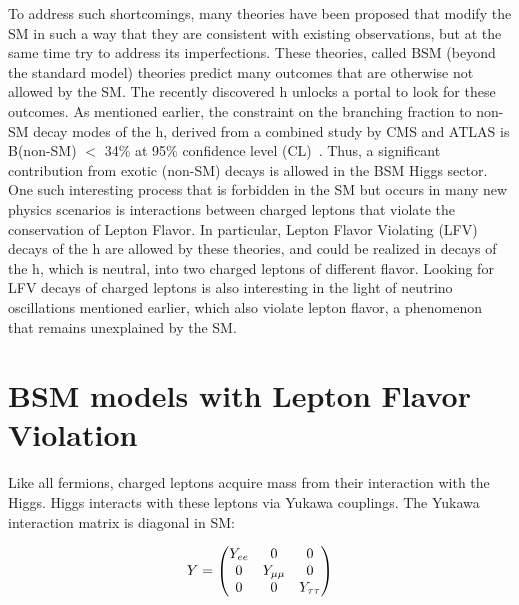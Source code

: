 To address such shortcomings, many theories have been proposed that modify the SM in such a way that they are consistent with existing observations, but at the same time try to address its imperfections. These theories, called BSM (beyond the standard model) theories predict many outcomes that are otherwise not allowed by the SM. The recently discovered h unlocks a portal to look for these outcomes. As mentioned earlier, the constraint on the branching fraction to non-SM decay modes of the h, derived from a combined study by CMS and ATLAS is B(non-SM) $<$ 34\% at 95\% confidence level (CL)~\cite{JHEP2016:45}. Thus, a significant contribution from exotic (non-SM) decays is allowed in the BSM Higgs sector. One such interesting process that is forbidden in the SM but occurs in many new physics scenarios is interactions between charged leptons that violate the conservation of Lepton Flavor. In particular, Lepton Flavor Violating (LFV) decays of the h are allowed by these theories, and could be realized in decays of the h, which is neutral, into two charged leptons of different flavor. Looking for LFV decays of charged leptons is also interesting in the light of neutrino oscillations mentioned earlier, which also violate lepton flavor, a phenomenon that remains unexplained by the SM.


\section{BSM models with Lepton Flavor Violation}
\label{sec:BSM}
Like all fermions, charged leptons acquire mass from their interaction with the Higgs. Higgs interacts with these leptons via Yukawa couplings. The Yukawa interaction matrix is diagonal in SM:

\[
  Y=\begin{pmatrix}
    Y_{ee}       & 0 & 0  \\
    0       & Y_{\mu\mu} & 0  \\
    0       & 0 & Y_{\tau\tau}
  \end{pmatrix}
\]

